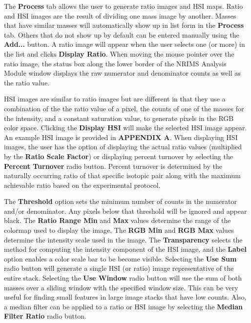 \documentclass{article}
\begin{document}
	The \textbf{Process} tab allows the user to generate ratio images and HSI maps. 
	Ratio and HSI images are the result of dividing one mass image by another. Masses that have 
	similar masses will automatically show up in list form in the \textbf{Process} tab.
	Others that do not show up by default can be 
	entered manually using the \textbf{Add...} button.
	A ratio image will appear when the user selects one (or more) in the list and 
	clicks \textbf{Display Ratio}. When moving the mouse pointer 
	over the ratio image, the 
	status box along the lower border of the NRIMS Analysis Module window displays 
	the raw numerator and denominator counts as well as the ratio value.

	HSI images are similar to ratio images but are different
	in that they use a combination of the the ratio value of a pixel, the counts of one of 
	the masses for the intensity, and a constant saturation value, to generate pixels in the RGB 
	color space. Clicking the \textbf{Display HSI} will make the selected HSI image appear. An example 
	HSI image is provided in \textbf{APPENDIX A}. When displaying HSI
	images, the user has the option of displaying the actual ratio values 
	(multiplied by the \textbf{Ratio Scale Factor}) or displaying percent turnover by selecting the 
	\textbf{Percent Turnover} radio button. Percent turnover is determined by the naturally occurring ratio
	of that specific isotopic pair along with the maximum achievable ratio based on the experimental protocol.

	The \textbf{Threshold} option sets the minimum number of counts in the numerator and/or 
	denominator. Any pixels below that threshold will be ignored and appear black.
	The \textbf{Ratio Range Min} and \textbf{Max} values determine the range of the colormap
	used to display the image. The \textbf{RGB Min} and \textbf{RGB Max} values determine
	the intensity scale used in the image. The \textbf{Transparency} selects the 
	method for computing the intensity component of the HSI image, and the \textbf{Label} 
	option enables a color scale bar to be become visible. Selecting the \textbf{Use Sum}
	radio button will generate a single HSI (or ratio) image representative of the entire stack. Selecting 
	the \textbf{Use Window} radio button will use the sum of both masses over a sliding window 
	with the specified window size. This can be very useful for finding small features in large image 
	stacks that have low counts. Also, a median filter 
	can be applied to a ratio or HSI image by selecting the \textbf{Median Filter Ratio} 
	radio button.
\end{document}
